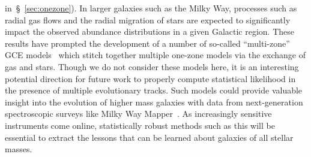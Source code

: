 \documentclass[ms.tex]{subfiles}
\begin{document}
in~\S~\ref{sec:onezone}).
In larger galaxies such as the Milky Way, processes such as radial gas flows
\citep[e.g.][]{Lacey1985, Bilitewski2012} and the radial migration of stars
\citep[e.g.][]{Sellwood2002, Loebman2011, Okalidis2022} are expected to
significantly impact the observed abundance distributions in a given Galactic
region.
These results have prompted the development of a number of so-called
``multi-zone'' GCE models~\citep[e.g.][]{Schoenrich2009, Johnson2021, Chen2022}
which stitch together multiple one-zone models via the exchange of gas and
stars.
Though we do not consider these models here, it is an interesting potential
direction for future work to properly compute statistical likelihood in the
presence of multiple evolutionary tracks.
Such models could provide valuable insight into the evolution of higher mass
galaxies with data from next-generation spectroscopic surveys like Milky
Way Mapper~\citep{Kollmeier2017}.
As increasingly sensitive instruments come online, statistically robust methods
such as this will be essential to extract the lessons that can be learned
about galaxies of all stellar masses.
\end{document}
